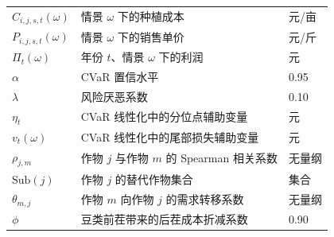 \begin{longtable}{p{}p{}p{}}
$C_{i,j,s,t}(\omega)$ & 情景 $\omega$ 下的种植成本 & 元/亩 \\
$P_{i,j,s,t}(\omega)$ & 情景 $\omega$ 下的销售单价 & 元/斤 \\
$\Pi_t(\omega)$ & 年份 $t$、情景 $\omega$ 下的利润 & 元 \\
$\alpha$ & CVaR 置信水平 & 0.95 \\
$\lambda$ & 风险厌恶系数 & 0.10 \\
$\eta_t$ & CVaR 线性化中的分位点辅助变量 & 元 \\
$v_t(\omega)$ & CVaR 线性化中的尾部损失辅助变量 & 元 \\
$\rho_{j,m}$ & 作物 $j$ 与作物 $m$ 的 Spearman 相关系数 & 无量纲 \\
$\mathrm{Sub}(j)$ & 作物 $j$ 的替代作物集合 & 集合 \\
$\theta_{m,j}$ & 作物 $m$ 向作物 $j$ 的需求转移系数 & 无量纲 \\
$\phi$ & 豆类前茬带来的后茬成本折减系数 & 0.90 \\
\bottomrule
\end{longtable}
